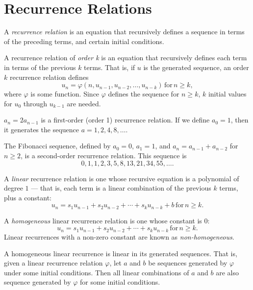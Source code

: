 \section{Recurrence Relations}

\begin{defn}
    A \emph{recurrence relation} is an equation that recursively defines a sequence in terms of the preceding terms, and certain initial conditions.
\end{defn}

\begin{defn}
    A recurrence relation of \emph{order k} is an equation that recursively defines each term in terms of the previous $k$ terms. That is, if $u$ is the generated sequence, an order $k$ recurrence relation defines \[u_n = \varphi(n, u_{n-1}, u_{n-2}, \ldots, u_{n-k}) \,\textrm{for}\, n \geq k,\] where $\varphi$ is some function. Since $\varphi$ defines the sequence for $n \geq k$, $k$ initial values for $u_0$ through $u_{k-1}$ are needed.
\end{defn}

\begin{exmp}
    $a_n = 2a_{n-1}$ is a first-order (order 1) recurrence relation. If we define $a_0 = 1$, then it generates the sequence $a = 1, 2, 4, 8, \ldots$.
\end{exmp}

\begin{exmp}
    The Fibonacci sequence, defined by $a_0 = 0$, $a_1 = 1$, and $a_n = a_{n-1} + a_{n-2}$ for $n \geq 2$, is a second-order recurrence relation. This sequence is \[0, 1, 1, 2, 3, 5, 8, 13, 21, 34, 55, \ldots.\]
\end{exmp}

\begin{defn}
    A \emph{linear} recurrence relation is one whose recursive equation is a polynomial of degree $1$ --- that is, each term is a linear combination of the previous $k$ terms, plus a constant: \[u_n = s_1u_{n-1} + s_2u_{n-2} + \cdots + s_ku_{n-k} + b \,\textrm{for}\, n \geq k.\]
\end{defn}

\begin{defn}
    A \emph{homogeneous} linear recurrence relation is one whose constant is $0$: \[u_n = s_1u_{n-1} + s_2u_{n-2} + \cdots + s_ku_{n-k} \,\textrm{for}\, n \geq k.\] Linear recurrences with a non-zero constant are known as \emph{non-homogeneous}.
\end{defn}

\begin{prop}\label{linear-combinations-are-recurrence-solutions}
    A homogeneous linear recurrence is linear in its generated sequences. That is, given a linear recurrence relation $\varphi$, let $a$ and $b$ be sequences generated by $\varphi$ under some initial conditions. Then all linear combinations of $a$ and $b$ are also sequence generated by $\varphi$ for some initial conditions.
\end{prop}


